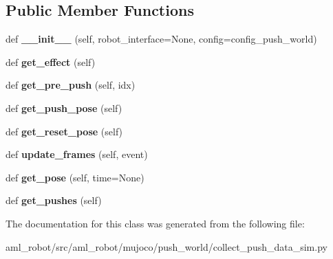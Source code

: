 \subsection*{Public Member Functions}
\begin{DoxyCompactItemize}
\item 
\hypertarget{classaml__robot_1_1mujoco_1_1push__world_1_1collect__push__data__sim_1_1_box_object_a990006c7e9199a0b1f5cba980839577b}{}\label{classaml__robot_1_1mujoco_1_1push__world_1_1collect__push__data__sim_1_1_box_object_a990006c7e9199a0b1f5cba980839577b} 
def {\bfseries \+\_\+\+\_\+init\+\_\+\+\_\+} (self, robot\+\_\+interface=None, config=config\+\_\+push\+\_\+world)
\item 
\hypertarget{classaml__robot_1_1mujoco_1_1push__world_1_1collect__push__data__sim_1_1_box_object_a5f75b7405b483648dba88c2a41a357a3}{}\label{classaml__robot_1_1mujoco_1_1push__world_1_1collect__push__data__sim_1_1_box_object_a5f75b7405b483648dba88c2a41a357a3} 
def {\bfseries get\+\_\+effect} (self)
\item 
\hypertarget{classaml__robot_1_1mujoco_1_1push__world_1_1collect__push__data__sim_1_1_box_object_a59caa5284e5855f4c030de6f32b2c56f}{}\label{classaml__robot_1_1mujoco_1_1push__world_1_1collect__push__data__sim_1_1_box_object_a59caa5284e5855f4c030de6f32b2c56f} 
def {\bfseries get\+\_\+pre\+\_\+push} (self, idx)
\item 
\hypertarget{classaml__robot_1_1mujoco_1_1push__world_1_1collect__push__data__sim_1_1_box_object_aef74c015c187c070a97040e8072b70f3}{}\label{classaml__robot_1_1mujoco_1_1push__world_1_1collect__push__data__sim_1_1_box_object_aef74c015c187c070a97040e8072b70f3} 
def {\bfseries get\+\_\+push\+\_\+pose} (self)
\item 
\hypertarget{classaml__robot_1_1mujoco_1_1push__world_1_1collect__push__data__sim_1_1_box_object_aa02f7a0db5feba48e8ccc77ecbfd7226}{}\label{classaml__robot_1_1mujoco_1_1push__world_1_1collect__push__data__sim_1_1_box_object_aa02f7a0db5feba48e8ccc77ecbfd7226} 
def {\bfseries get\+\_\+reset\+\_\+pose} (self)
\item 
\hypertarget{classaml__robot_1_1mujoco_1_1push__world_1_1collect__push__data__sim_1_1_box_object_a6df2f189f1a1d62d325f12302f58468b}{}\label{classaml__robot_1_1mujoco_1_1push__world_1_1collect__push__data__sim_1_1_box_object_a6df2f189f1a1d62d325f12302f58468b} 
def {\bfseries update\+\_\+frames} (self, event)
\item 
\hypertarget{classaml__robot_1_1mujoco_1_1push__world_1_1collect__push__data__sim_1_1_box_object_abe0ed37fb9871fdabe25d37fb232c8e9}{}\label{classaml__robot_1_1mujoco_1_1push__world_1_1collect__push__data__sim_1_1_box_object_abe0ed37fb9871fdabe25d37fb232c8e9} 
def {\bfseries get\+\_\+pose} (self, time=None)
\item 
\hypertarget{classaml__robot_1_1mujoco_1_1push__world_1_1collect__push__data__sim_1_1_box_object_a5bbeb597aa433756befa1b0eceeb8582}{}\label{classaml__robot_1_1mujoco_1_1push__world_1_1collect__push__data__sim_1_1_box_object_a5bbeb597aa433756befa1b0eceeb8582} 
def {\bfseries get\+\_\+pushes} (self)
\end{DoxyCompactItemize}


The documentation for this class was generated from the following file\+:\begin{DoxyCompactItemize}
\item 
aml\+\_\+robot/src/aml\+\_\+robot/mujoco/push\+\_\+world/collect\+\_\+push\+\_\+data\+\_\+sim.\+py\end{DoxyCompactItemize}
